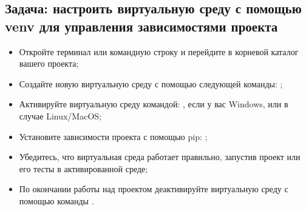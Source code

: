 \documentclass[letterpaper,10pt,russian]{sphinxmanual}
\begin{document}
\subsection{Задача: настроить виртуальную среду с помощью venv для управления зависимостями проекта}
\label{\detokenize{educational_materials/path_venv/exercises:id3}}\begin{itemize}
\item {} 
\sphinxAtStartPar
Откройте терминал или командную строку и перейдите в корневой каталог вашего проекта;

\item {} 
\sphinxAtStartPar
Создайте новую виртуальную среду с помощью следующей команды: ;

\item {} 
\sphinxAtStartPar
Активируйте виртуальную среду командой: , если у вас Windows, или  в случае Linux/MacOS;

\item {} 
\sphinxAtStartPar
Установите зависимости проекта с помощью pip: ;

\item {} 
\sphinxAtStartPar
Убедитесь, что виртуальная среда работает правильно, запустив проект или его тесты в активированной среде;

\item {} 
\sphinxAtStartPar
По окончании работы над проектом деактивируйте виртуальную среду с помощью команды .

\end{itemize}
\end{document}
